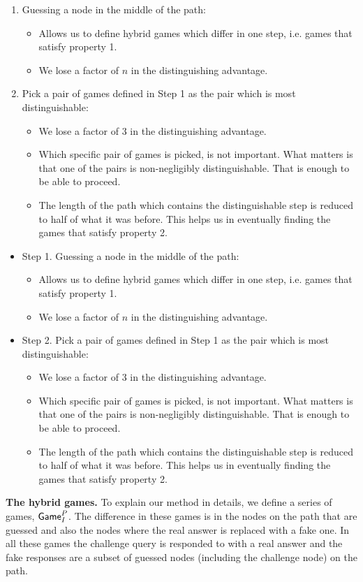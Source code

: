 \documentclass{article}
\newcommand{\game}{{\sf Game}}
\newcommand{\dgg}[2]{\game_{#1}^{#2}}
\begin{document}
\begin{enumerate}[Step 1.]
\item Guessing a node in the middle of the path: \begin{itemize} \item Allows us to define hybrid games which differ in one step, i.e. games that satisfy property 1. \item We lose a factor of $n$ in the distinguishing advantage. \end{itemize}
\item Pick a pair of games defined in Step 1 as the pair which is most distinguishable: \begin{itemize} \item We lose a factor of 3 in the distinguishing advantage. \item  Which specific pair of games is picked, is not important. What matters is that one of the pairs is non-negligibly distinguishable. That is enough to be able to proceed. \item The length of the path which contains the distinguishable step is reduced to half of what it was before. This helps us in eventually finding the games that satisfy property 2.
\end{itemize}
\end{enumerate}
\else

\begin{itemize}
\item Step 1. Guessing a node in the middle of the path: \begin{itemize} \item Allows us to define hybrid games which differ in one step, i.e. games that satisfy property 1. \item We lose a factor of $n$ in the distinguishing advantage. \end{itemize}
\item Step 2. Pick a pair of games defined in Step 1 as the pair which is most distinguishable: \begin{itemize} \item We lose a factor of 3 in the distinguishing advantage. \item  Which specific pair of games is picked, is not important. What matters is that one of the pairs is non-negligibly distinguishable. That is enough to be able to proceed. \item The length of the path which contains the distinguishable step is reduced to half of what it was before. This helps us in eventually finding the games that satisfy property 2.
\end{itemize}
\end{itemize}
\fi
\textbf{The hybrid games.} To explain our method in details, we define a series of games, $\dgg{I}{P}$. The difference in these games is in the nodes on the path that are guessed and also the nodes where the real answer is replaced with a fake one. In all these games the challenge query is responded to with a real answer and the fake responses are a subset of guessed nodes (including the challenge node) on the path. 
\end{document}
